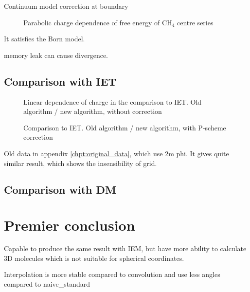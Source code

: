 Continuum model correction at boundary

\begin{figure}[h]
\caption{Parabolic charge dependence of free energy of $\mathrm{C}\mathrm{H}_{4}$
centre series}
\end{figure}

It satisfies the Born model.

memory leak can cause divergence.

\subsection{Comparison with IET}

\begin{figure}[h]
\caption{Linear dependence of charge in the comparison to IET. Old algorithm
/ new algorithm, without correction}
\end{figure}

\begin{figure}[h]
\caption{Comparison to IET. Old algorithm / new algorithm, with P-scheme correction}
\end{figure}

Old data in appendix \ref{chpt:original_data}, which use 2m phi.
It gives quite similar result, which shows the insensibility of grid.

\subsection{Comparison with DM }

\section{Premier conclusion}

Capable to produce the same result with IEM, but have more ability
to calculate 3D molecules which is not suitable for spherical coordinates.

Interpolation is more stable compared to convolution and use less
angles compared to naive\_standard
